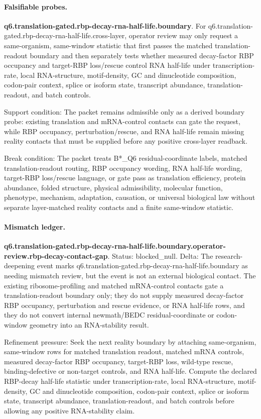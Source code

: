 \paragraph{Falsifiable probes.}
\textbf{q6.translation-gated.rbp-decay-rna-half-life.boundary}. For q6.translation-gated.rbp-decay-rna-half-life.cross-layer, operator review may only request a same-organism, same-window statistic that first passes the matched translation-readout boundary and then separately tests whether measured decay-factor RBP occupancy and target-RBP loss/rescue control RNA half-life under transcription-rate, local RNA-structure, motif-density, GC and dinucleotide composition, codon-pair context, splice or isoform state, transcript abundance, translation-readout, and batch controls.

Support condition: The packet remains admissible only as a derived boundary probe: existing translation and mRNA-control contacts can gate the request, while RBP occupancy, perturbation/rescue, and RNA half-life remain missing reality contacts that must be supplied before any positive cross-layer readback.

Break condition: The packet treats B*\_Q6 residual-coordinate labels, matched translation-readout routing, RBP occupancy wording, RNA half-life wording, target-RBP loss/rescue language, or gate pass as translation efficiency, protein abundance, folded structure, physical admissibility, molecular function, phenotype, mechanism, adaptation, causation, or universal biological law without separate layer-matched reality contacts and a finite same-window statistic.

\paragraph{Mismatch ledger.}
\textbf{q6.translation-gated.rbp-decay-rna-half-life.boundary.operator-review.rbp-decay-contact-gap}. Status: blocked\_null. Delta: The research-deepening event marks q6.translation-gated.rbp-decay-rna-half-life.boundary as needing mismatch review, but the event is not an external biological contact. The existing ribosome-profiling and matched mRNA-control contacts gate a translation-readout boundary only; they do not supply measured decay-factor RBP occupancy, perturbation and rescue evidence, or RNA half-life rows, and they do not convert internal newmath/BEDC residual-coordinate or codon-window geometry into an RNA-stability result.

Refinement pressure: Seek the next reality boundary by attaching same-organism, same-window rows for matched translation readout, matched mRNA controls, measured decay-factor RBP occupancy, target-RBP loss, wild-type rescue, binding-defective or non-target controls, and RNA half-life. Compute the declared RBP-decay half-life statistic under transcription-rate, local RNA-structure, motif-density, GC and dinucleotide composition, codon-pair context, splice or isoform state, transcript abundance, translation-readout, and batch controls before allowing any positive RNA-stability claim.

